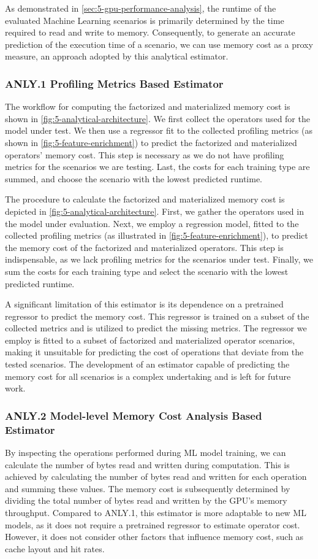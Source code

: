 As demonstrated in \autoref{sec:5-gpu-performance-analysis}, the runtime of the evaluated Machine Learning scenarios is primarily determined by the time required to read and write to memory. Consequently, to generate an accurate prediction of the execution time of a scenario, we can use memory cost as a proxy measure, an approach adopted by this analytical estimator.

\subsubsection*{ANLY.1 Profiling Metrics Based Estimator}
The workflow for computing the factorized and materialized memory cost is shown in \autoref{fig:5-analytical-architecture}. We first collect the operators used for the model under test. We then use a regressor fit to the collected profiling metrics (as shown in \autoref{fig:5-feature-enrichment}) to predict the factorized and materialized operators' memory cost. This step is necessary as we do not have profiling metrics for the scenarios we are testing. Last, the costs for each training type are summed, and choose the scenario with the lowest predicted runtime.

The procedure to calculate the factorized and materialized memory cost is depicted in \autoref{fig:5-analytical-architecture}. First, we gather the operators used in the model under evaluation. Next, we employ a regression model, fitted to the collected profiling metrics (as illustrated in \autoref{fig:5-feature-enrichment}), to predict the memory cost of the factorized and materialized operators. This step is indispensable, as we lack profiling metrics for the scenarios under test. Finally, we sum the costs for each training type and select the scenario with the lowest predicted runtime.

A significant limitation of this estimator is its dependence on a pretrained regressor to predict the memory cost. This regressor is trained on a subset of the collected metrics and is utilized to predict the missing metrics. The regressor we employ is fitted to a subset of factorized and materialized operator scenarios, making it unsuitable for predicting the cost of operations that deviate from the tested scenarios. The development of an estimator capable of predicting the memory cost for all scenarios is a complex undertaking and is left for future work.

\subsubsection*{ANLY.2 Model-level Memory Cost Analysis Based Estimator}
By inspecting the operations performed during ML model training, we can calculate the number of bytes read and written during computation. This is achieved by calculating the number of bytes read and written for each operation and summing these values. The memory cost is subsequently determined by dividing the total number of bytes read and written by the GPU’s memory throughput. Compared to ANLY.1, this estimator is more adaptable to new ML models, as it does not require a pretrained regressor to estimate operator cost. However, it does not consider other factors that influence memory cost, such as cache layout and hit rates.

